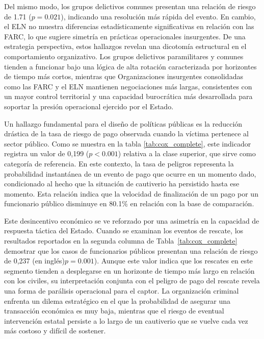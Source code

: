 \documentclass[12pt]{article}
\theoremstyle{definition}
\theoremstyle{remark}
\newcommand{\1}{\mathbf{1}}
\begin{document}
Del mismo modo, los grupos delictivos comunes presentan una relación de riesgo de 1.71 ($p=0.021$), indicando una resolución más rápida del evento. En cambio, el ELN no muestra diferencias estadísticamente significativas en relación con las FARC, lo que sugiere simetría en prácticas operacionales insurgentes. De una estrategia perspectiva, estos hallazgos revelan una dicotomía estructural en el comportamiento organizativo. Los grupos delictivos paramilitares y comunes tienden a funcionar bajo una lógica de alta rotación caracterizada por horizontes de tiempo más cortos, mientras que Organizaciones insurgentes consolidadas como las FARC y el ELN mantienen negociaciones más largas, consistentes con un mayor control territorial y una capacidad burocrática más desarrollada para soportar la presión operacional ejercido por el Estado.

Un hallazgo fundamental para el diseño de políticas públicas es la reducción drástica de la tasa de riesgo de pago observada cuando la víctima pertenece al sector público. Como se muestra en la tabla \ref{tab:cox_complete}, este indicador registra un valor de 0,199 ($p < 0.001$) relativa a la clase superior, que sirve como categoría de referencia. En este contexto, la tasa de peligros representa la probabilidad instantánea de un evento de pago que ocurre en un momento dado, condicionado al hecho que la situación de cautiverio ha persistido hasta ese momento. Esta relación indica que la velocidad de finalización de un pago por un funcionario público disminuye en 80.1\% en relación con la base de comparación.

Este desincentivo económico se ve reforzado por una asimetría en la capacidad de respuesta táctica del Estado. Cuando se examinan los eventos de rescate, los resultados reportados en la segunda columna de Tabla~\ref{tab:cox_complete} demostrar que los casos de funcionarios públicos presentan una relación de riesgo de 0,237 (en inglés)$p = 0.001$). Aunque este valor indica que los rescates en este segmento tienden a desplegarse en un horizonte de tiempo más largo en relación con los civiles, su interpretación conjunta con el peligro de pago del rescate revela una forma de parálisis operacional para el captor. La organización criminal enfrenta un dilema estratégico en el que la probabilidad de asegurar una transacción económica es muy baja, mientras que el riesgo de eventual intervención estatal persiste a lo largo de un cautiverio que se vuelve cada vez más costoso y difícil de sostener.
\end{document}
